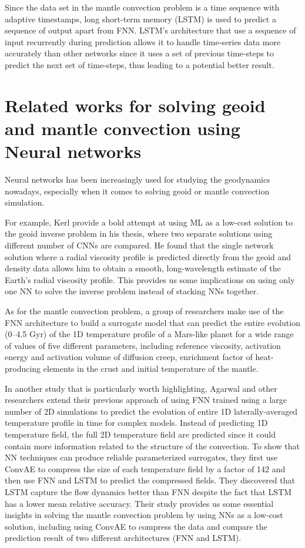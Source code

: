 Since the data set in the mantle convection problem is a time sequence with adaptive timestamps, long short-term memory (LSTM) is used to predict a sequence of output apart from FNN. LSTM's architecture that use a sequence of input recurrently during prediction allows it to handle time-series data more accurately than other networks since it uses a set of previous time-steps to predict the next set of time-steps, thus leading to a potential better result.


\section{Related works for solving geoid and mantle convection using Neural networks}

Neural networks has been increasingly used for studying the geodynamics nowadays, especially when it comes to solving geoid or mantle convection simulation. 

For example, Kerl provide a bold attempt at using ML as a low-cost solution to the geoid inverse problem in his thesis, where two separate solutions using different number of CNNs are compared.\citep{kerl2022geoid} He found that the single network solution where a radial viscosity profile is predicted directly from the geoid and density data allows him to obtain a smooth, long-wavelength estimate of the Earth’s radial viscosity profile. This provides us some implications on using only one NN to solve the inverse problem instead of stacking NNs together.

As for the mantle convection problem, a group of researchers \citep{10.1093_gji_ggaa234} make use of the FNN architecture to build a surrogate model that can predict the entire evolution (0–4.5 Gyr) of the 1D temperature profile of a Mars-like planet for a wide range of values of five different parameters, including reference viscosity, activation energy and activation volume of diffusion creep, enrichment factor of heat-producing elements in the crust and initial temperature of the mantle.

In another study that is particularly worth highlighting, Agarwal and other researchers extend their previous approach \citep{10.1093_gji_ggaa234} of using FNN trained using a large number of 2D simulations to predict the evolution of entire 1D laterally-averaged temperature profile in time for complex models. Instead of predicting 1D temperature field, the full 2D temperature field are predicted since it could contain more information related to the structure of the convection.\citep{10.1103_physrevfluids.6.113801} To show that NN techniques can produce reliable parameterized surrogates, they first use ConvAE to compress the size of each temperature field by a factor of 142 and then use FNN and LSTM to predict the compressed fields. They discovered that LSTM capture the flow dynamics better than FNN despite the fact that LSTM has a lower mean relative accuracy. Their study provides us some essential insights in solving the mantle convection problem by using NNs as a low-cost solution, including using ConvAE to compress the data and compare the prediction result of two different architectures (FNN and LSTM).

